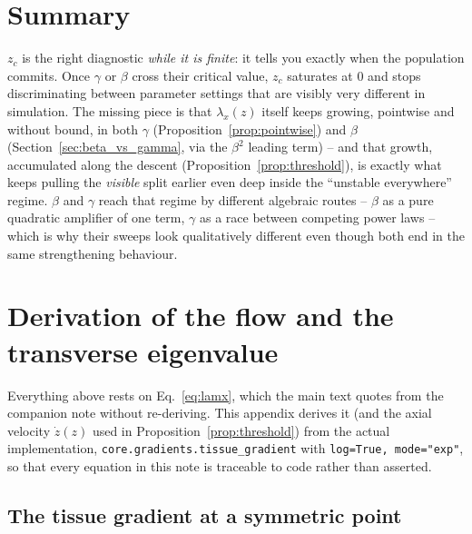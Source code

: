 \documentclass[11pt,a4paper]{article}
\theoremstyle{plain}
\theoremstyle{definition}
\theoremstyle{remark}
\newcommand{\lam}{\lambda}
\newcommand{\bw}{\beta}
\begin{document}
\section{Summary}

\begin{keybox}
$z_c$ is the right diagnostic \emph{while it is finite}: it tells you
exactly when the population commits. Once $\gamma$ or $\bw$ cross their
critical value, $z_c$ saturates at $0$ and stops discriminating between
parameter settings that are visibly very different in simulation. The
missing piece is that $\lam_x(z)$ itself keeps growing, pointwise and
without bound, in both $\gamma$ (Proposition~\ref{prop:pointwise}) and
$\bw$ (Section~\ref{sec:beta_vs_gamma}, via the $\bw^2$ leading term) --
and that growth, accumulated along the descent
(Proposition~\ref{prop:threshold}), is exactly what keeps pulling the
\emph{visible} split earlier even deep inside the ``unstable everywhere''
regime. $\bw$ and $\gamma$ reach that regime by different algebraic
routes -- $\bw$ as a pure quadratic amplifier of one term, $\gamma$ as a
race between competing power laws -- which is why their sweeps look
qualitatively different even though both end in the same strengthening
behaviour.
\end{keybox}

\appendix

\section{Derivation of the flow and the transverse eigenvalue}
\label{app:flow}

Everything above rests on Eq.~\eqref{eq:lamx}, which the main text quotes
from the companion note without re-deriving. This appendix derives it (and
the axial velocity $\dot z(z)$ used in Proposition~\ref{prop:threshold})
from the actual implementation, \texttt{core.gradients.tissue\_gradient}
with \texttt{log=True, mode="exp"}, so that every equation in this note is
traceable to code rather than asserted.

\subsection{The tissue gradient at a symmetric point}
\end{document}

